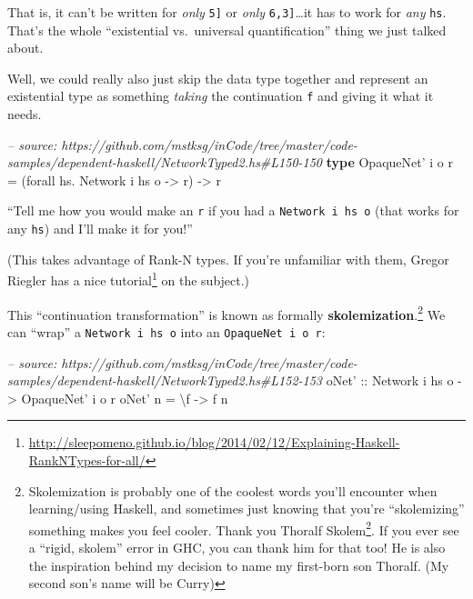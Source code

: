 \documentclass[]{article}
\newenvironment{Shaded}{}{}
\newcommand{\KeywordTok}[1]{\textcolor[rgb]{0.00,0.44,0.13}{\textbf{{#1}}}}
\newcommand{\DataTypeTok}[1]{\textcolor[rgb]{0.56,0.13,0.00}{{#1}}}
\newcommand{\CommentTok}[1]{\textcolor[rgb]{0.38,0.63,0.69}{\textit{{#1}}}}
\newcommand{\OtherTok}[1]{\textcolor[rgb]{0.00,0.44,0.13}{{#1}}}
\newcommand{\FunctionTok}[1]{\textcolor[rgb]{0.02,0.16,0.49}{{#1}}}
\newcommand{\NormalTok}[1]{{#1}}
\renewcommand{\href}[2]{#2\footnote{\url{#1}}}
\begin{document}
That is, it can't be written for \emph{only} \texttt{\textquotesingle{}{[}5{]}}
or \emph{only} \texttt{\textquotesingle{}{[}6,3{]}}\ldots{}it has to work for
\emph{any} \texttt{hs}. That's the whole ``existential vs.~universal
quantification'' thing we just talked about.

Well, we could really also just skip the data type together and represent an
existential type as something \emph{taking} the continuation \texttt{f} and
giving it what it needs.

\begin{Shaded}
\begin{Highlighting}[]
\CommentTok{-- source: https://github.com/mstksg/inCode/tree/master/code-samples/dependent-haskell/NetworkTyped2.hs#L150-150}
\KeywordTok{type} \DataTypeTok{OpaqueNet'} \NormalTok{i o r }\FunctionTok{=} \NormalTok{(forall hs}\FunctionTok{.} \DataTypeTok{Network} \NormalTok{i hs o }\OtherTok{->} \NormalTok{r) }\OtherTok{->} \NormalTok{r}
\end{Highlighting}
\end{Shaded}

``Tell me how you would make an \texttt{r} if you had a
\texttt{Network\ i\ hs\ o} (that works for any \texttt{hs}) and I'll make it for
you!''

(This takes advantage of Rank-N types. If you're unfamiliar with them, Gregor
Riegler has a
\href{http://sleepomeno.github.io/blog/2014/02/12/Explaining-Haskell-RankNTypes-for-all/}{nice
tutorial} on the subject.)

This ``continuation transformation'' is known as formally
\textbf{skolemization}.\footnote{Skolemization is probably one of the coolest
  words you'll encounter when learning/using Haskell, and sometimes just knowing
  that you're ``skolemizing'' something makes you feel cooler. Thank you
  \href{https://en.wikipedia.org/wiki/Thoralf_Skolem}{Thoralf Skolem}. If you
  ever see a ``rigid, skolem'' error in GHC, you can thank him for that too! He
  is also the inspiration behind my decision to name my first-born son Thoralf.
  (My second son's name will be Curry)} We can ``wrap'' a
\texttt{Network\ i\ hs\ o} into an
\texttt{OpaqueNet\textquotesingle{}\ i\ o\ r}:

\begin{Shaded}
\begin{Highlighting}[]
\CommentTok{-- source: https://github.com/mstksg/inCode/tree/master/code-samples/dependent-haskell/NetworkTyped2.hs#L152-153}
\OtherTok{oNet' ::} \DataTypeTok{Network} \NormalTok{i hs o }\OtherTok{->} \DataTypeTok{OpaqueNet'} \NormalTok{i o r}
\NormalTok{oNet' n }\FunctionTok{=} \NormalTok{\textbackslash{}f }\OtherTok{->} \NormalTok{f n}
\end{Highlighting}
\end{Shaded}
\end{document}
